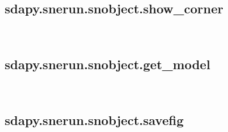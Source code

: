 \documentclass[letterpaper,10pt,english]{sphinxmanual}
\begin{document}
\subsection{sdapy.snerun.snobject.show\_corner}
\label{\detokenize{generated/sdapy.snerun.snobject.show_corner:sdapy-snerun-snobject-show-corner}}\label{\detokenize{generated/sdapy.snerun.snobject.show_corner::doc}}

\begin{fulllineitems}
\label{\detokenize{generated/sdapy.snerun.snobject.show_corner:sdapy.snerun.snobject.show_corner}}~
\end{fulllineitems}



\subsection{sdapy.snerun.snobject.get\_model}
\label{\detokenize{generated/sdapy.snerun.snobject.get_model:sdapy-snerun-snobject-get-model}}\label{\detokenize{generated/sdapy.snerun.snobject.get_model::doc}}

\begin{fulllineitems}
\label{\detokenize{generated/sdapy.snerun.snobject.get_model:sdapy.snerun.snobject.get_model}}~
\end{fulllineitems}



\subsection{sdapy.snerun.snobject.savefig}
\label{\detokenize{generated/sdapy.snerun.snobject.savefig:sdapy-snerun-snobject-savefig}}\label{\detokenize{generated/sdapy.snerun.snobject.savefig::doc}}
\end{document}
